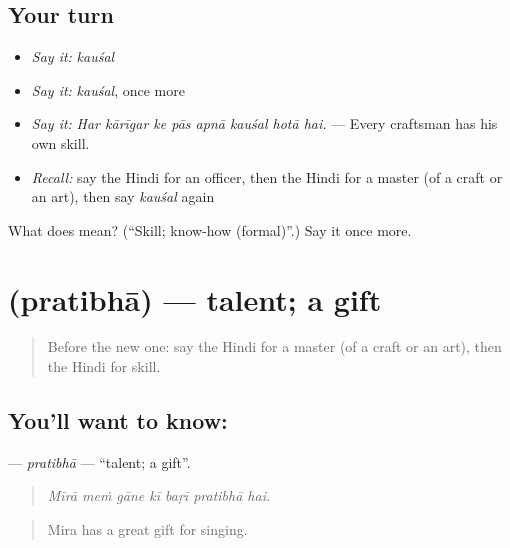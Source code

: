 \subsection*{Your turn}
\begin{itemize}
\raggedright
  \item \emph{Say it:} \emph{kauśal}
  \item \emph{Say it:} \emph{kauśal}, once more
  \item \emph{Say it:} \emph{Har kārīgar ke pās apnā kauśal hotā hai.} — Every craftsman has his own skill.
  \item \emph{Recall:} say the Hindi for an officer, then the Hindi for a master (of a craft or an art), then say \emph{kauśal} again
\end{itemize}

\begin{tcolorbox}[breakable,colback=teal!4,colframe=teal!35!black,title={Before you move on}]
What does  mean? (\textquotedblleft{}Skill; know-how (formal)\textquotedblright{}.) Say it once more.
\end{tcolorbox}
\section[\texorpdfstring{\hi{प्रतिभा} (pratibhā)}{प्रतिभा (pratibhā)}]{ (pratibhā) — talent; a gift}

\label{lesson:HI-C507-pratibha}



\begin{quote}
Before the new one: say the Hindi for a master (of a craft or an art), then the Hindi for skill.
\end{quote}

\subsection*{You'll want to know: }
\textbf{} — \emph{pratibhā} — \textquotedblleft{}talent; a gift\textquotedblright{}.

\begin{quote}
      
\end{quote}

\begin{quote}
\emph{Mīrā meṁ gāne kī baṛī pratibhā hai.}
\end{quote}

\begin{quote}
Mira has a great gift for singing.
\end{quote}

